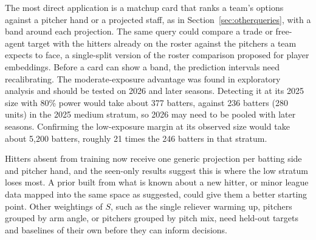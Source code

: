\documentclass[11pt,letterpaper]{article}
\begin{document}
The most direct application is a matchup card that ranks a team's options against a pitcher hand or a projected staff, as in Section~\ref{sec:otherqueries}, with a band around each projection. The same query could compare a trade or free-agent target with the hitters already on the roster against the pitchers a team expects to face, a single-split version of the roster comparison \citet{alcorn2018} proposed for player embeddings. Before a card can show a band, the prediction intervals need recalibrating. The moderate-exposure advantage was found in exploratory analysis and should be tested on 2026 and later seasons. Detecting it at its 2025 size with 80\% power would take about 377 batters, against 236 batters (280 units) in the 2025 medium stratum, so 2026 may need to be pooled with later seasons. Confirming the low-exposure margin at its observed size would take about 5,200 batters, roughly 21 times the 246 batters in that stratum.

Hitters absent from training now receive one generic projection per batting side and pitcher hand, and the seen-only results suggest this is where the low stratum loses most. A prior built from what is known about a new hitter, or minor league data mapped into the same space as \citet{alcorn2018} suggested, could give them a better starting point. Other weightings of $S$, such as the single reliever warming up, pitchers grouped by arm angle, or pitchers grouped by pitch mix, need held-out targets and baselines of their own before they can inform decisions.



\end{document}
